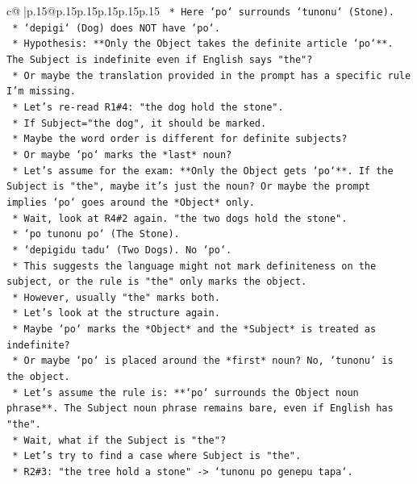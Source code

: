 \documentclass{article}
\begin{document}
{\begin{supertabular}{c@{$\;$}|p{.15\linewidth}@{}p{.15\linewidth}p{.15\linewidth}p{.15\linewidth}p{.15\linewidth}p{.15\linewidth}}
{{{\texttt{        *   Here `po` surrounds `tunonu` (Stone).} \\
\texttt{        *   `depigi` (Dog) does NOT have `po`.} \\
\texttt{        *   Hypothesis: **Only the Object takes the definite article `po`**. The Subject is indefinite even if English says "the"?} \\
\texttt{        *   Or maybe the translation provided in the prompt has a specific rule I'm missing.} \\
\texttt{        *   Let's re{-}read R1\#4: "the dog hold the stone".} \\
\texttt{        *   If Subject="the dog", it should be marked.} \\
\texttt{        *   Maybe the word order is different for definite subjects?} \\
\texttt{        *   Or maybe `po` marks the *last* noun?} \\
\texttt{        *   Let's assume for the exam: **Only the Object gets `po`**. If the Subject is "the", maybe it's just the noun? Or maybe the prompt implies `po` goes around the *Object* only.} \\
\texttt{        *   Wait, look at R4\#2 again. "the two dogs hold the stone".} \\
\texttt{        *   `po tunonu po` (The Stone).} \\
\texttt{        *   `depigidu tadu` (Two Dogs). No `po`.} \\
\texttt{        *   This suggests the language might not mark definiteness on the subject, or the rule is "the" only marks the object.} \\
\texttt{        *   However, usually "the" marks both.} \\
\texttt{        *   Let's look at the structure again.} \\
\texttt{        *   Maybe `po` marks the *Object* and the *Subject* is treated as indefinite?} \\
\texttt{        *   Or maybe `po` is placed around the *first* noun? No, `tunonu` is the object.} \\
\texttt{        *   Let's assume the rule is: **`po` surrounds the Object noun phrase**. The Subject noun phrase remains bare, even if English has "the".} \\
\texttt{        *   Wait, what if the Subject is "the"?} \\
\texttt{        *   Let's try to find a case where Subject is "the".} \\
\texttt{        *   R2\#3: "the tree hold a stone" {-}> `tunonu po genepu tapa`.} \\
}}}
\end{supertabular}}
\end{document}
